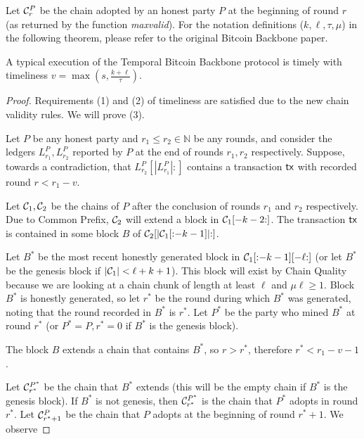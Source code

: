 Let $\mathcal{C}^P_r$ be the chain adopted by an honest party $P$ at the
beginning of round $r$ (as returned by the function \emph{maxvalid}).
For the notation definitions ($k, \ell, \tau, \mu$)
in the following theorem, please refer to the original Bitcoin
Backbone paper.

\begin{theorem}
  A typical execution of the Temporal Bitcoin Backbone protocol is timely
  with timeliness $v = \max(s, \frac{k + \ell}{\tau})$.
\end{theorem}
\begin{proof}
  Requirements (1) and (2) of timeliness are satisfied due to the new chain validity rules.
  We will prove (3).

  Let $P$ be any honest party and $r_1 \leq r_2 \in \mathbb{N}$ be any rounds, and consider
  the ledgers $L^P_{r_1}, L^P_{r_2}$ reported by $P$ at the end of rounds $r_1, r_2$ respectively.
  Suppose, towards a contradiction, that $L^P_{r_2}[|L^P_{r_1}|{:}]$ contains a transaction
  $\textsf{tx}$ with recorded round $r < r_1 - v$.

  Let $\mathcal{C}_1, \mathcal{C}_2$ be the chains of $P$ after the conclusion of rounds $r_1$
  and $r_2$ respectively.
  Due to Common Prefix, $\mathcal{C}_2$ will extend a block in $\mathcal{C}_1[{-k-2}{:}]$.
  The transaction $\textsf{tx}$ is contained in some block $B$ of $\mathcal{C}_2[{|\mathcal{C}_1[{:}{-k-1}]|}{:}]$.

  Let $B^*$ be the most recent
  honestly generated block in $\mathcal{C}_1[{:}{-k-1}][-\ell{:}]$
  (or let $B^*$ be the genesis block if $|\mathcal{C}_1| < \ell + k + 1$).
  This block will exist by
  Chain Quality because we are looking at a chain chunk of length at least $\ell$ and
  $\mu\ell \geq 1$.
  Block $B^*$ is honestly generated, so let $r^*$ be the round
  during which $B^*$ was generated, noting that the round recorded in $B^*$ is $r^*$.
  Let $P^*$ be the party who mined $B^*$ at round $r^*$ (or $P^* = P, r^* = 0$ if $B^*$ is
  the genesis block).

  The block $B$ extends a chain that contains $B^*$, so $r > r^*$,
  therefore $r^* < r_1 - v - 1$.

  Let $\mathcal{C}^{P^*}_{r^*}$ be the chain that $B^*$ extends (this will be the empty chain if
  $B^*$ is the genesis block). If $B^*$ is not genesis, then $\mathcal{C}^{P^*}_{r^*}$ is the chain
  that $P^*$ adopts in round $r^*$. Let $\mathcal{C}^P_{r^* + 1}$ be the chain that $P$ adopts
  at the beginning of round $r^* + 1$. We observe


\end{proof}
